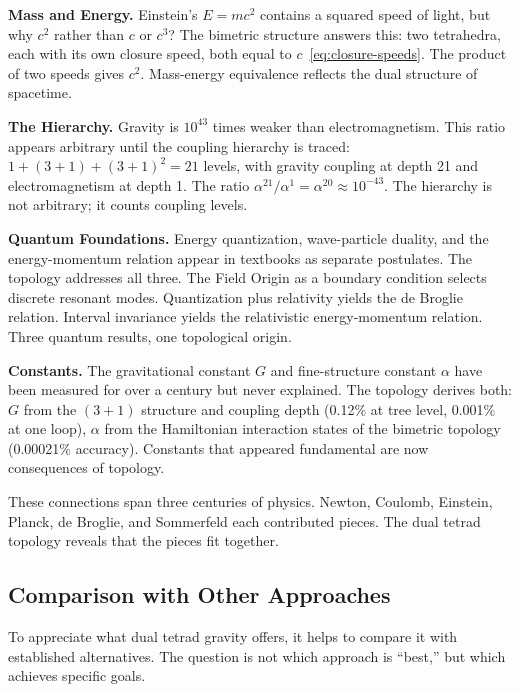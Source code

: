 \documentclass[aps,prd,preprint,superscriptaddress,showpacs,preprintnumbers,amsmath,amssymb,nofootinbib]{revtex4-2}
\begin{document}
\textbf{Mass and Energy.} Einstein's $E = mc^2$ contains a squared speed of light, but why $c^2$ rather than $c$ or $c^3$? The bimetric structure answers this: two tetrahedra, each with its own closure speed, both equal to $c$~\eqref{eq:closure-speeds}. The product of two speeds gives $c^2$. Mass-energy equivalence reflects the dual structure of spacetime.

\textbf{The Hierarchy.} Gravity is $10^{43}$ times weaker than electromagnetism. This ratio appears arbitrary until the coupling hierarchy is traced: $1 + (3+1) + (3+1)^2 = 21$ levels, with gravity coupling at depth 21 and electromagnetism at depth 1. The ratio $\alpha^{21}/\alpha^{1} = \alpha^{20} \approx 10^{-43}$. The hierarchy is not arbitrary; it counts coupling levels.

\textbf{Quantum Foundations.} Energy quantization, wave-particle duality, and the energy-momentum relation appear in textbooks as separate postulates. The topology addresses all three. The Field Origin as a boundary condition selects discrete resonant modes. Quantization plus relativity yields the de Broglie relation. Interval invariance yields the relativistic energy-momentum relation. Three quantum results, one topological origin.

\textbf{Constants.} The gravitational constant $G$ and fine-structure constant $\alpha$ have been measured for over a century but never explained. The topology derives both: $G$ from the $(3+1)$ structure and coupling depth (0.12\% at tree level, 0.001\% at one loop), $\alpha$ from the Hamiltonian interaction states of the bimetric topology (0.00021\% accuracy). Constants that appeared fundamental are now consequences of topology.

These connections span three centuries of physics. Newton, Coulomb, Einstein, Planck, de Broglie, and Sommerfeld each contributed pieces. The dual tetrad topology reveals that the pieces fit together.

\subsection{Comparison with Other Approaches}
\label{subsec:comparison}

To appreciate what dual tetrad gravity offers, it helps to compare it with established alternatives. The question is not which approach is ``best,'' but which achieves specific goals.
\end{document}
